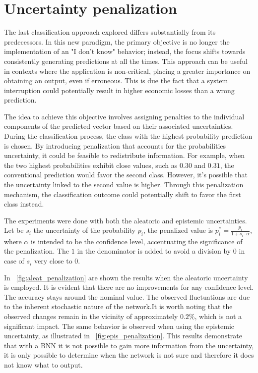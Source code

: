 \section{Uncertainty penalization}

The last classification approach explored differs substantially from its predecessors. In this new paradigm, the primary objective is no longer the implementation of an "I don't know" behavior; instead, the focus shifts towards consistently generating predictions at all the times. This approach can be useful in contexts where the application is non-critical, placing a greater importance on obtaining an output, even if erroneous. This is due the fact that a system interruption could potentially result in higher economic losses than a wrong prediction.

The idea to achieve this objective involves assigning penalties to the individual components of the predicted vector based on their associated uncertainties. During the classification process, the class with the highest probability prediction is chosen. By introducing penalization that accounts for the probabilities uncertainty, it could be feasible to redistribute information. For example, when the two highest probabilities exhibit close values, such as $0.30$ and $0.31$, the conventional prediction would favor the second class. However, it's possible that the uncertainty linked to the second value is higher. Through this penalization mechanism, the classification outcome could potentially shift to favor the first class instead.

The experiments were done with both the aleatoric and epistemic uncertainties. Let be $s_i$ the uncertainty of the probability $p_i$, the penalized value is $p_i^* = \frac{p_i}{1 + s_i \cdot \alpha}$, where $\alpha$ is intended to be the confidence level, accentuating the significance of the penalization. The $1$ in the denominator is added to avoid a division by $0$ in case of $s_i$ very close to $0$.

In \Fig~\ref{fig:aleat_penalization} are shown the results when the aleatoric uncertainty is employed. It is evident that there are no improvements for any confidence level. The accuracy stays around the nominal value. The observed fluctuations are due to the inherent stochastic nature of the network.It is worth noting that the observed changes remain in the vicinity of approximately $0.2\%$, which is not a significant impact. The same behavior is observed when using the epistemic uncertainty, as illustrated in \Fig~\ref{fig:epis_penalization}. This results demonstrate that with a BNN it is not possible to gain more information from the uncertainty, it is only possible to determine when the network is not sure and therefore it does not know what to output.

